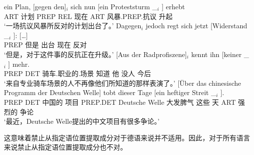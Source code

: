 \begin{sloppypar}
\ex 
\gll ein Plan, [gegen den]$_i$ sich nun [ein Proteststurm \_$_i$ ] erhebt\footnotemark\\
     ART 计划 \spacebr{}PREP REL  现在 \spacebr{}ART 风暴.PREP.抗议 {} {} 升起\\
\glt `一场抗议风暴所反对的计划出台了。'
\ex 
\gll {}Dagegen$_i$ jedoch regt sich jetzt [Widerstand \_$_i$ ]: [\ldots]\footnotemark\\
	{}PREP 但是 出台  现在 \spacebr{}反对 {}\\
\glt `但是，对于这件事的反抗正在升级。'
\largerpage[2]
\ex
\gll {}[Aus der Radprofiszene]$_i$ kennt ihn [keiner \_$_i$ ] mehr.\footnotemark\\
	 {}\spacebr{}PREP DET 骑车.职业的.场景 知道 他 \spacebr{}没人 {} {} 今后\\
\glt `来自专业骑车场景的人不再像他们所知道的那样表演了。'
\ex 
\gll {}[Über das chinesische Programm der Deutschen Welle] tobt dieser Tage [ein heftiger Streit \_$_i$ ].\footnotemark\\
     \spacebr{}PREP DET 中国的 项目 PREP.DET Deutsche Welle 大发脾气 这些 天 \spacebr{}ART 强烈的 争论\\
\glt `最近，Deutsche Welle提出的中文项目有很多争论。'
\zl
\end{sloppypar}

\noindent
这意味着禁止从指定语位置提取成分对于德语来说并不适用。因此，对于所有语言来说禁止从指定语位置提取成分也不对。

